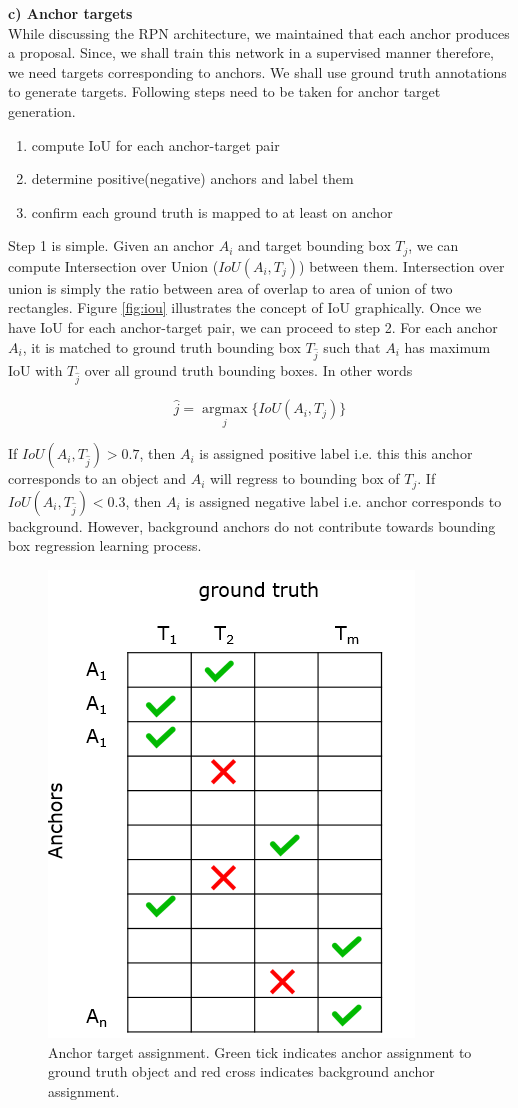 \textbf{c) Anchor targets} \\
While discussing the RPN architecture, we maintained that each anchor produces a proposal. Since, we shall train this network in a supervised manner therefore, we need targets corresponding to anchors. We shall use ground truth annotations to generate targets. Following steps need to be taken for anchor target generation.
\begin{enumerate}
    \item compute IoU for each anchor-target pair
    \item determine positive(negative) anchors and label them 
    \item confirm each ground truth is mapped to  at least on anchor 
\end{enumerate}

Step 1 is simple. Given an anchor $A_i$ and target bounding box $T_j$, we can compute Intersection over Union ($IoU(A_i,T_j)$) between them. Intersection over union is simply the ratio between area of overlap to area of union of two rectangles. Figure \ref{fig:iou} illustrates the concept of IoU graphically. Once we have IoU for each anchor-target pair, we can proceed to step 2. For each anchor $A_i$, it is matched to ground truth bounding box $T_{\hat{j}}$ such that $A_i$ has maximum IoU with $T_{\hat{j}}$ over all ground truth bounding boxes. In other words

$$ \hat{j} = \operatorname*{argmax}_{j} \{ IoU(A_i,T_j) \} $$

If $IoU(A_i,T_{\hat{j}}) > 0.7$, then $A_i$ is assigned positive label i.e. this this anchor corresponds to an object and $A_i$ will regress to bounding box of $T_j$. If $IoU(A_i,T_{\hat{j}}) < 0.3$, then $A_i$ is assigned negative label i.e. anchor corresponds to background. However, background anchors do not contribute towards bounding box regression learning process. 

\begin{figure}
    \centering
    \includegraphics[width=0.5\linewidth]{images/anchor-targets.PNG}
    \caption[Anchor target assignment]{Anchor target assignment. Green tick indicates anchor assignment to ground truth object and red cross indicates background anchor assignment.}
    \label{fig:anchor-targets}
\end{figure}


